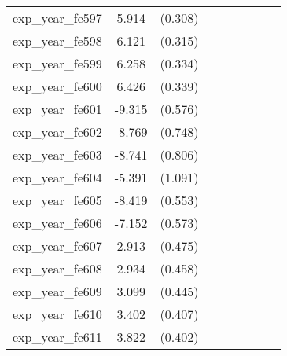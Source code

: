 {\begin{tabular}{l*{4}{cc}}
exp\_year\_fe597&    5.914\sym{***}&  (0.308)&                  &         &                  &         &                  &         \\
exp\_year\_fe598&    6.121\sym{***}&  (0.315)&                  &         &                  &         &                  &         \\
exp\_year\_fe599&    6.258\sym{***}&  (0.334)&                  &         &                  &         &                  &         \\
exp\_year\_fe600&    6.426\sym{***}&  (0.339)&                  &         &                  &         &                  &         \\
exp\_year\_fe601&   -9.315\sym{***}&  (0.576)&                  &         &                  &         &                  &         \\
exp\_year\_fe602&   -8.769\sym{***}&  (0.748)&                  &         &                  &         &                  &         \\
exp\_year\_fe603&   -8.741\sym{***}&  (0.806)&                  &         &                  &         &                  &         \\
exp\_year\_fe604&   -5.391\sym{***}&  (1.091)&                  &         &                  &         &                  &         \\
exp\_year\_fe605&   -8.419\sym{***}&  (0.553)&                  &         &                  &         &                  &         \\
exp\_year\_fe606&   -7.152\sym{***}&  (0.573)&                  &         &                  &         &                  &         \\
exp\_year\_fe607&    2.913\sym{***}&  (0.475)&                  &         &                  &         &                  &         \\
exp\_year\_fe608&    2.934\sym{***}&  (0.458)&                  &         &                  &         &                  &         \\
exp\_year\_fe609&    3.099\sym{***}&  (0.445)&                  &         &                  &         &                  &         \\
exp\_year\_fe610&    3.402\sym{***}&  (0.407)&                  &         &                  &         &                  &         \\
exp\_year\_fe611&    3.822\sym{***}&  (0.402)&                  &         &                  &         &                  &         \\

\end{tabular}}

